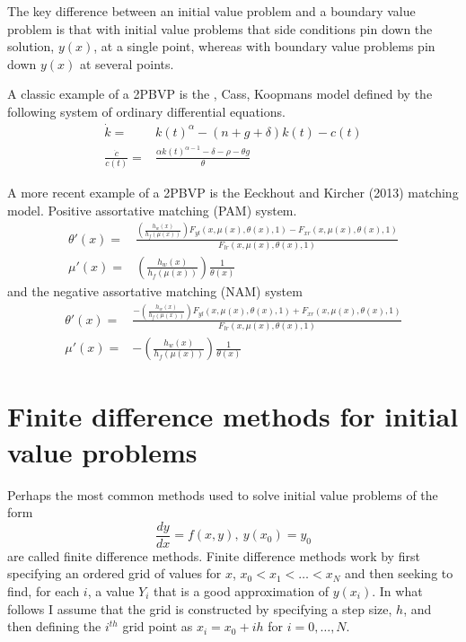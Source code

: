 \documentclass[11pt]{article}
\begin{document}
The key difference between an initial value problem and a boundary value problem is that with initial value problems that side conditions pin down the solution, $y(x)$, at a single point, whereas with boundary value problems pin down $y(x)$ at several points.

A classic example of a 2PBVP is the \cite{ramsey1928mathematical}, Cass, Koopmans model defined by the following system of ordinary differential equations.
 \begin{align}
 	\dot{k} =& k(t)^{\alpha} - (n+g+\delta)k(t) - c(t)  \label{eq:ramsey-capital-motion}\\
	\frac{\dot{c}}{c(t)} =& \frac{\alpha k(t)^{\alpha-1} - \delta - \rho - \theta g}{\theta} \label{eq:ramsey-consumption-euler}
 \end{align}

A more recent example of a 2PBVP is the Eeckhout and Kircher (2013) matching model. Positive assortative matching (PAM) system.
\begin{align}
	\theta'(x) =& \frac{\left(\frac{h_w(x)}{h_f(\mu(x))}\right)F_{yl}(x, \mu(x), \theta(x), 1) - F_{xr}(x, \mu(x), \theta(x), 1)}{F_{lr}(x, \mu(x), \theta(x), 1)} \\
	\mu'(x) =& \left(\frac{h_w(x)}{h_f(\mu(x))}\right)\frac{1}{\theta(x)}
\end{align}
and the negative assortative matching (NAM) system
\begin{align}
	\theta'(x) =& \frac{-\left(\frac{h_w(x)}{h_f(\mu(x))}\right)F_{yl}(x, \mu(x), \theta(x), 1) + F_{xr}(x, \mu(x), \theta(x), 1)}{F_{lr}(x, \mu(x), \theta(x), 1)} \\
	\mu'(x) =& -\left(\frac{h_w(x)}{h_f(\mu(x))}\right)\frac{1}{\theta(x)}
\end{align}

\section{Finite difference methods for initial value problems}  
Perhaps the most common methods used to solve initial value problems of the form
\begin{equation}\label{eq:ivp-benchmark}
\frac{dy}{dx} = f(x, y),\ y(x_0)=y_0
\end{equation}
are called finite difference methods. Finite difference methods work by first specifying an ordered grid of values for $x$, $x_0< x_1<\dots<x_N$ and then seeking to find, for each $i$, a value $Y_i$ that is a good approximation of $y(x_i)$.  In what follows I assume that the grid is constructed by specifying a step size, $h$, and then defining the $i^{th}$ grid point as $x_i = x_0 + ih$ for $i=0,\dots,N$.
\end{document}
